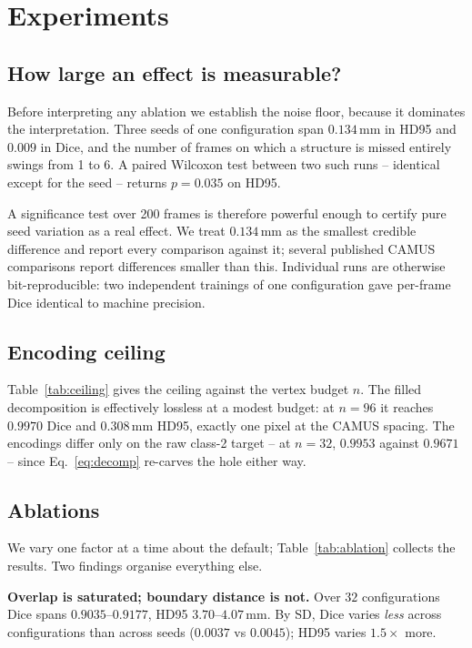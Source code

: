 \section{Experiments}
\label{sec:experiments}

\subsection{How large an effect is measurable?}
\label{sec:noise}

Before interpreting any ablation we establish the noise floor, because it
dominates the interpretation. Three seeds of one configuration span
$0.134$\,mm in HD95 and $0.009$ in Dice, and the number of frames on which a
structure is missed entirely swings from 1 to 6. A paired Wilcoxon test between
two such runs -- identical except for the seed -- returns $p{=}0.035$ on HD95.

A significance test over 200 frames is therefore powerful enough to certify pure
seed variation as a real effect. We treat $0.134$\,mm as the smallest credible
difference and report every comparison against it; several published CAMUS
comparisons report differences smaller than this. Individual runs are otherwise
bit-reproducible: two independent trainings of one configuration gave per-frame
Dice identical to machine precision.

\subsection{Encoding ceiling}

Table~\ref{tab:ceiling} gives the ceiling against the vertex budget $n$. The
filled decomposition is effectively lossless at a modest budget: at $n{=}96$ it
reaches $0.9970$ Dice and $0.308$\,mm HD95, exactly one pixel at the CAMUS
spacing. The encodings differ only on the raw class-2 target -- at $n{=}32$,
$0.9953$ against $0.9671$ -- since Eq.~\ref{eq:decomp} re-carves the hole either
way.



\subsection{Ablations}

We vary one factor at a time about the default; Table~\ref{tab:ablation}
collects the results. Two findings organise everything else.

\textbf{Overlap is saturated; boundary distance is not.} Over $32$
configurations Dice spans $0.9035$--$0.9177$, HD95 $3.70$--$4.07$\,mm. By SD,
Dice varies \emph{less} across configurations than across seeds ($0.0037$ vs
$0.0045$); HD95 varies $1.5\times$ more.

